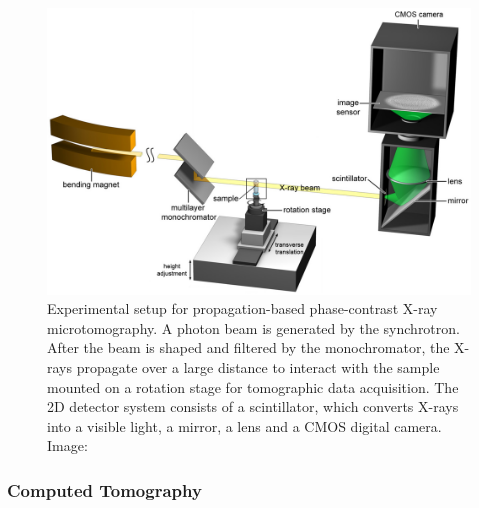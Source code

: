 \begin{figure}[ht]
  \centerline{
    \mbox{\includegraphics[scale= 0.30]{figures/tomo_setup.png}}
  }
  \caption{Experimental setup for propagation-based phase-contrast X-ray
microtomography. A photon beam is generated by the synchrotron. After the beam is shaped and filtered by the monochromator, the X-rays propagate over a large distance
to interact with the sample mounted on a rotation stage for
tomographic data acquisition. The 2D detector system consists of a scintillator, which converts X-rays into a visible light, a mirror, a lens and a CMOS digital camera. Image: \cite{Nature13} }
  \label{fig:tomo_setup}
\end{figure}



\subsubsection{Computed Tomography}
\label{computed_tomography}

